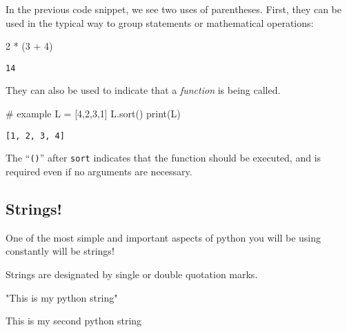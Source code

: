 \documentclass[
  letterpaper,
  DIV=11,
  numbers=noendperiod]{scrartcl}
\newenvironment{Shaded}{\begin{snugshade}}{\end{snugshade}}
\newcommand{\BuiltInTok}[1]{\textcolor[rgb]{0.00,0.23,0.31}{#1}}
\newcommand{\CommentTok}[1]{\textcolor[rgb]{0.37,0.37,0.37}{#1}}
\newcommand{\DecValTok}[1]{\textcolor[rgb]{0.68,0.00,0.00}{#1}}
\newcommand{\NormalTok}[1]{\textcolor[rgb]{0.00,0.23,0.31}{#1}}
\newcommand{\OperatorTok}[1]{\textcolor[rgb]{0.37,0.37,0.37}{#1}}
\begin{document}
In the previous code snippet, we see two uses of parentheses. First,
they can be used in the typical way to group statements or mathematical
operations:

\begin{Shaded}
\begin{Highlighting}[]
\DecValTok{2} \OperatorTok{*}\NormalTok{ (}\DecValTok{3} \OperatorTok{+} \DecValTok{4}\NormalTok{)}
\end{Highlighting}
\end{Shaded}

\begin{verbatim}
14
\end{verbatim}

They can also be used to indicate that a \emph{function} is being
called.

\begin{Shaded}
\begin{Highlighting}[]
\CommentTok{\# example}
\NormalTok{L }\OperatorTok{=}\NormalTok{ [}\DecValTok{4}\NormalTok{,}\DecValTok{2}\NormalTok{,}\DecValTok{3}\NormalTok{,}\DecValTok{1}\NormalTok{]}
\NormalTok{L.sort()}
\BuiltInTok{print}\NormalTok{(L)}
\end{Highlighting}
\end{Shaded}

\begin{verbatim}
[1, 2, 3, 4]
\end{verbatim}

The ``\texttt{()}'' after \texttt{sort} indicates that the function
should be executed, and is required even if no arguments are necessary.

\hypertarget{strings}{%
\subsection{Strings!}\label{strings}}

One of the most simple and important aspects of python you will be using
constantly will be strings!

Strings are designated by single or double quotation marks.

\begin{Shaded}
\begin{Highlighting}[]

\CommentTok{"This is my python string"} 

\CommentTok{\textquotesingle{}This is my second python string\textquotesingle{}}
\end{Highlighting}
\end{Shaded}
\end{document}
